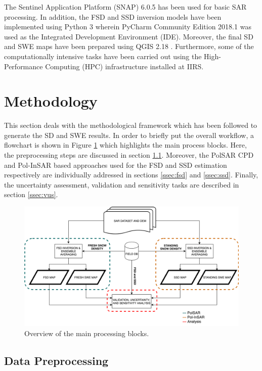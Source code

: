 \documentclass[review]{elsarticle}
\numberwithin{equation}{section}
\numberwithin{figure}{section}
\numberwithin{table}{section}
\begin{document}
The Sentinel Application Platform (SNAP) 6.0.5 \citep{ESA2018} has been used for basic SAR processing. In addition, the FSD and SSD inversion models have been implemented using Python 3 wherein PyCharm Community Edition 2018.1 \citep{JetBrains2018} was used as the Integrated Development Environment (IDE). Moreover, the final SD and SWE maps have been prepared using QGIS 2.18 \citep{QGIS2016}. Furthermore, some of the computationally intensive tasks have been carried out using the High-Performance Computing (HPC) infrastructure installed at IIRS.

\section{Methodology}
\label{sec:method}

This section deals with the methodological framework which has been followed to generate the SD and SWE results. In order to briefly put the overall workflow, a flowchart is shown in Figure \ref{fig:method_overview} which highlights the main process blocks. Here, the preprocessing steps are discussed in section \ref{ssec:pre}. Moreover, the PolSAR CPD and Pol-InSAR based approaches used for the FSD and SSD estimation respectively are individually addressed in sections \ref{ssec:fsd} and \ref{ssec:ssd}. Finally, the uncertainty assessment, validation and sensitivity tasks are described in section \ref{ssec:vus}.

\begin{figure}[htb]
    \centering
    \includegraphics[width=\textwidth]{Figures/Methods/Overview_Method.png}
    \caption{Overview of the main processing blocks.}
    \label{fig:method_overview}
\end{figure}

\subsection{Data Preprocessing}
\label{ssec:pre}
\end{document}
